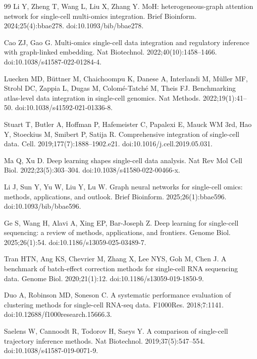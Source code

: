 \documentclass[referee, pdflatex, sn-vancouver-num]{sn-jnl}
\begin{document}
\begin{thebibliography}{99}
Li Y, Zheng T, Wang L, Liu X, Zhang Y. MoH: heterogeneous-graph attention network for single-cell multi-omics integration. Brief Bioinform. 2024;25(4):bbae278. doi:10.1093/bib/bbae278.

Cao ZJ, Gao G. Multi-omics single-cell data integration and regulatory inference with graph-linked embedding. Nat Biotechnol. 2022;40(10):1458--1466. doi:10.1038/s41587-022-01284-4.

Luecken MD, B\"{u}ttner M, Chaichoompu K, Danese A, Interlandi M, M\"{u}ller MF, Strobl DC, Zappia L, Dugas M, Colom\'e-Tatch\'e M, Theis FJ. Benchmarking atlas-level data integration in single-cell genomics. Nat Methods. 2022;19(1):41--50. doi:10.1038/s41592-021-01336-8.

Stuart T, Butler A, Hoffman P, Hafemeister C, Papalexi E, Mauck WM 3rd, Hao Y, Stoeckius M, Smibert P, Satija R. Comprehensive integration of single-cell data. Cell. 2019;177(7):1888--1902.e21. doi:10.1016/j.cell.2019.05.031.

Ma Q, Xu D. Deep learning shapes single-cell data analysis. Nat Rev Mol Cell Biol. 2022;23(5):303--304. doi:10.1038/s41580-022-00466-x.

Li J, Sun Y, Yu W, Liu Y, Lu W. Graph neural networks for single-cell omics: methods, applications, and outlook. Brief Bioinform. 2025;26(1):bbae596. doi:10.1093/bib/bbae596.

Ge S, Wang H, Alavi A, Xing EP, Bar-Joseph Z. Deep learning for single-cell sequencing: a review of methods, applications, and frontiers. Genome Biol. 2025;26(1):54. doi:10.1186/s13059-025-03489-7.

Tran HTN, Ang KS, Chevrier M, Zhang X, Lee NYS, Goh M, Chen J. A benchmark of batch-effect correction methods for single-cell RNA sequencing data. Genome Biol. 2020;21(1):12. doi:10.1186/s13059-019-1850-9.

Duo A, Robinson MD, Soneson C. A systematic performance evaluation of clustering methods for single-cell RNA-seq data. F1000Res. 2018;7:1141. doi:10.12688/f1000research.15666.3.

Saelens W, Cannoodt R, Todorov H, Saeys Y. A comparison of single-cell trajectory inference methods. Nat Biotechnol. 2019;37(5):547--554. doi:10.1038/s41587-019-0071-9.


\end{thebibliography}
\end{document}
